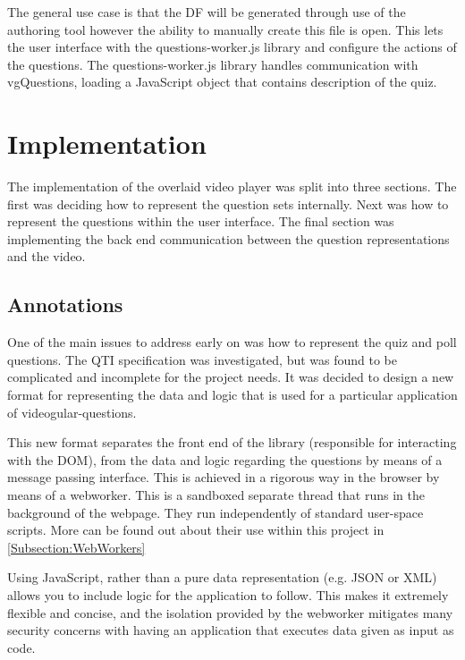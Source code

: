 The general use case is that the \gls{DF} will be generated through use of the authoring tool however the ability to manually create this file is open. This lets the user interface with the questions-worker.js library and configure the actions of the questions. The questions-worker.js library handles communication with vgQuestions, loading a JavaScript object that contains description of the quiz.

\section{Implementation}
The implementation of the overlaid video player was split into three sections. The first was deciding how to represent the question sets internally. Next was how to represent the questions within the user interface. The final section was implementing the back end communication between the question representations and the video.

\subsection{Annotations}
\label{Section:Annotations}

One of the main issues to address early on was how to represent the quiz and poll questions. The \gls{QTI} specification was investigated, but was found to be complicated and incomplete  for the project needs. It was decided to design a new format for representing the data and logic that is used for a particular application of videogular-questions.

This new format separates the front end of the library (responsible for interacting with the \gls{DOM}), from the data and logic regarding the questions by means of a message passing interface. This is achieved in a rigorous way in the browser by means of a \gls{webworker}. This is a sandboxed separate thread that runs in the background of the webpage. They run independently of standard user-space scripts.  More can be found out about their use within this project in \autoref{Subsection:WebWorkers}

Using JavaScript, rather than a pure data representation (e.g. JSON or XML) allows you to include logic for the application to follow. This makes it extremely flexible and concise, and the isolation provided by the \gls{webworker} mitigates many security concerns with having an application that executes data given as input as code.

